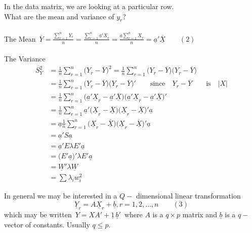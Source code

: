 \documentclass[11pt,a4paper]{article}
\theoremstyle{definition}
\begin{document}
In the data matrix, we are looking at a particular row.\\

What are the mean and variance of $y_r$?\\\\

The Mean\,
$\displaystyle{\overline{Y}= \frac{\sum\limits^n_{r=1}Y_r}{n}=\frac{\sum\limits^n_{r=1}\underline{a}'\underline{X}_r}{n}=\frac{\underline{a}\sum\limits^n_{r=1}\underline{X}_r}{n}=\underline{a}'\underline{\overline{X}}\qquad (2)}$\\\\

The Variance
\begin{align*}
S^2_Y & = \frac{1}{n}\sum^n_{r=1}\big(Y_r-\overline{Y}\big)^2 = \frac{1}{n}\sum^n_{r=1}\big(Y_r-\overline{Y}\big)\big(Y_r-\overline{Y}\big)\\
      & = \frac{1}{n}\sum^n_{r=1}\big(Y_r-\overline{Y}\big)\big(Y_r-\overline{Y}\big)'\qquad \text{since}\quad  Y_r-\overline{Y}\qquad \text{is}\quad  |X|\\
      & = \frac{1}{n}\sum^n_{r=1}\big(\underline{a}'\underline{X}_r-\underline{a}'\underline{\overline{X}}\big)\big(\underline{a}'\underline{X}_r-\underline{a}'\overline{\underline{X}}\big)'\\
      & = \frac{1}{n}\sum^n_{r=1}\underline{a}'\big(\underline{X}_r-\overline{\underline{X}}\big)\big(\underline{X}_r-\overline{\underline{X}}\big)'\underline{a}\\
      & = \underline{a}\frac{1}{n} \sum^n_{r=1}\big(\underline{X}_r-\overline{\underline{X}}\big)\big(\underline{X}_r-\overline{\underline{X}}\big)'\underline{a}\\
      & = \underline{a}'S\underline{a}\\
      & = \underline{a}'E\lambda E'\underline{a}\\
      & = \big(E'\underline{a}\big)'\lambda E'\underline{a}\\
      & = \underline{W}'\lambda \underline{W}\\
      & = \sum \lambda_iw_i^2
\end{align*}

In general we may be interested in a $Q-$ dimensional linear transformation $$\underline{Y}_r=A\underline{X}_r+\underline{b},  r=1,2,\ldots, n\qquad  (3)$$
which may be written\, 
$Y=XA'+\underline{1}\, \underline{b}'$\,
where $A$ is a $q\times p$ matrix and $\underline{b}$ is a $q-$ vector of constants. Usually $q\leq p$.\\
\end{document}
